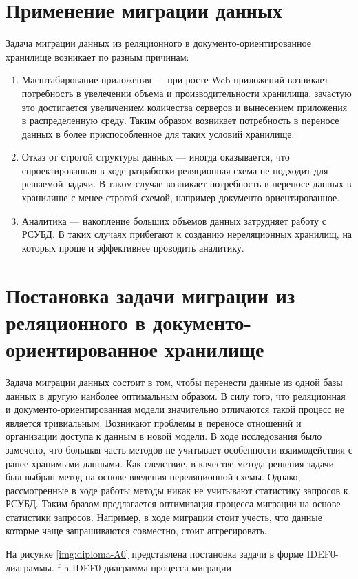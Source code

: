 \section{Применение миграции данных}
Задача миграции данных из реляционного в документо-ориентированное хранилище возникает по разным причинам:
\begin{enumerate}
    \item Масштабирование приложения --- при росте Web-приложений возникает потребность в увелечении объема и производительности хранилища,
    зачастую это достигается увеличением количества серверов и вынесением приложения в распределенную среду.
    Таким образом возникает потребность в переносе данных в более приспособленное для таких условий хранилище.
    
    \item Отказ от строгой структуры данных --- иногда оказывается, что спроектированная в ходе разработки реляционная схема не подходит для решаемой задачи.
    В таком случае возникает потребность в переносе данных в хранилище с менее строгой схемой, например документо-ориентированное.

    \item Аналитика --- накопление больших объемов данных затрудняет работу с РСУБД.
    В таких случаях прибегают к созданию нереляционных хранилищ, на которых проще и эффективнее проводить аналитику.
\end{enumerate}

\clearpage

\section{Постановка задачи миграции из реляционного в документо-ориентированное хранилище}
Задача миграции данных состоит в том, 
чтобы перенести данные из одной базы данных в другую наиболее оптимальным образом.
В силу того, что реляционная и документо-ориентированная модели
значительно отличаются такой процесс не является тривиальным.
Возникают проблемы в переносе отношений и организации доступа к данным в новой модели.
В ходе исследования было замечено, что большая часть методов не
учитывает особенности взаимодействия с ранее хранимыми данными.
Как следствие, в качестве метода решения задачи был выбран метод на основе введения нереляционной схемы.
Однако, рассмотренные в ходе работы методы никак не учитывают статистику запросов к РСУБД. 
Таким бразом предлагается оптимизация процесса миграции на основе статистики запросов.
Например, в ходе миграции стоит учесть, что данные которые чаще запрашиваются совместно, стоит аггрегировать.

На рисунке \ref{img:diploma-A0} представлена постановка задачи в форме IDEF0-
диаграммы.
    {f}
    {h}
    {\textwidth}
    {IDEF0-диаграмма процесса миграции}
